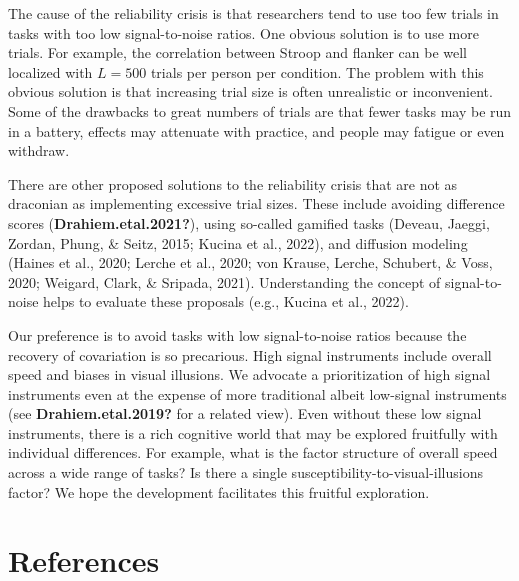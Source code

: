 \documentclass[
  ,man]{apa6}
\begin{document}
The cause of the reliability crisis is that researchers tend to use too few trials in tasks with too low signal-to-noise ratios. One obvious solution is to use more trials. For example, the correlation between Stroop and flanker can be well localized with \(L=500\) trials per person per condition. The problem with this obvious solution is that increasing trial size is often unrealistic or inconvenient. Some of the drawbacks to great numbers of trials are that fewer tasks may be run in a battery, effects may attenuate with practice, and people may fatigue or even withdraw.

There are other proposed solutions to the reliability crisis that are not as draconian as implementing excessive trial sizes. These include avoiding difference scores (\textbf{Drahiem.etal.2021?}), using so-called gamified tasks (Deveau, Jaeggi, Zordan, Phung, \& Seitz, 2015; Kucina et al., 2022), and diffusion modeling (Haines et al., 2020; Lerche et al., 2020; von Krause, Lerche, Schubert, \& Voss, 2020; Weigard, Clark, \& Sripada, 2021). Understanding the concept of signal-to-noise helps to evaluate these proposals (e.g., Kucina et al., 2022).

Our preference is to avoid tasks with low signal-to-noise ratios because the recovery of covariation is so precarious. High signal instruments include overall speed and biases in visual illusions. We advocate a prioritization of high signal instruments even at the expense of more traditional albeit low-signal instruments (see \textbf{Drahiem.etal.2019?} for a related view). Even without these low signal instruments, there is a rich cognitive world that may be explored fruitfully with individual differences. For example, what is the factor structure of overall speed across a wide range of tasks? Is there a single susceptibility-to-visual-illusions factor? We hope the development facilitates this fruitful exploration.

\newpage

\hypertarget{references}{%
\section*{References}\label{references}}
\end{document}
